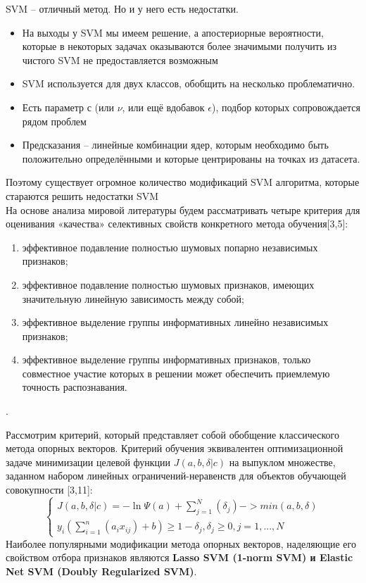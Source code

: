 \documentclass[../body.tex]{subfiles}
\begin{document}
\vspace{\baselineskip}
SVM – отличный метод. Но и у него есть недостатки.
\begin{itemize}
	\item  На выходы у SVM мы имеем решение, а апостериорные вероятности, которые в некоторых задачах оказываются более значимыми получить из чистого SVM не предоставляется возможным
	\item  SVM используется для двух классов, обобщить на несколько
	проблематично.
	\item Есть параметр $с$ (или $\nu$, или ещё вдобавок $\epsilon$), подбор которых сопровождается рядом проблем
	\item Предсказания – линейные комбинации ядер, которым
	необходимо быть положительно определёнными и которые
	центрированы на точках из датасета.
\end{itemize}
Поэтому существует огромное количество модификаций SVM алгоритма, которые стараются решить недостатки SVM 
\\

На основе анализа мировой литературы будем рассматривать четыре критерия для
оценивания «качества» селективных свойств конкретного метода обучения[3,5]:
\begin{enumerate}\label{points}
	\item эффективное подавление полностью шумовых попарно независимых признаков;
	\item эффективное подавление полностью шумовых признаков, имеющих значительную
	линейную зависимость между собой;
	\item  эффективное выделение группы информативных линейно независимых признаков;
	\item эффективное выделение группы информативных признаков, только совместное участие которых в решении может обеспечить приемлемую точность распознавания.
\end{enumerate}.

Рассмотрим критерий, который представляет собой обобщение классического метода опорных векторов.
Критерий обучения эквивалентен оптимизационной задаче минимизации целевой функции $J(a, b, \delta |c)$ на выпуклом множестве, заданном набором линейных ограничений-неравенств для объектов обучающей совокупности [3,11]: 
\begin{equation}\label{criterion}
	\left\{\begin{matrix}
		J(a, b, \delta |c) = -\ln{\varPsi(a)}+ \sum_{j=1}^{N}(\delta_j)->min(a,b,\delta)
		\\
		y_i(\sum_{i=1}^{n}(a_ix_{ij})+b)\geq1-\delta_j, \delta_j \geq 0, j= 1,...,N 
	\end{matrix}\right.
\end{equation}
Наиболее популярными модификации метода опорных векторов, наделяющие его свойством отбора признаков являются \textbf{Lasso SVM
	(1-norm SVM) и Elastic Net SVM (Doubly Regularized SVM)}.
\end{document}
